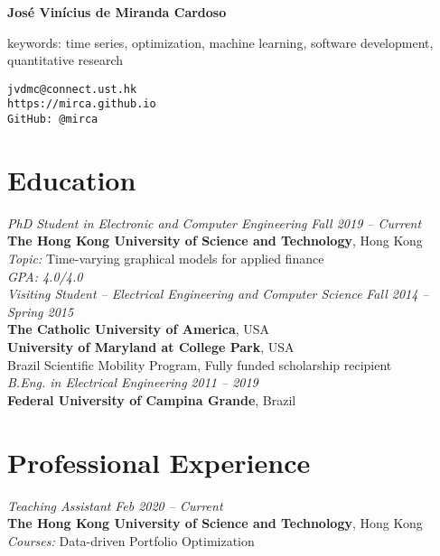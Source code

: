\documentclass[10pt]{article}
\begin{document}
\pagestyle{empty}
\begin{titlepage}
     {\Large{\textbf{Jos\'e Vin\'icius de Miranda Cardoso}}}
     \vspace{.5cm}

    \begin{minipage}[b]{9cm}
      keywords: time series, optimization, machine learning, software development, quantitative research\\
    \end{minipage}
    \hfill
    \begin{minipage}[b]{4cm}
        \hfill \texttt{jvdmc@connect.ust.hk}\\
        \texttt{https://mirca.github.io}\\
        \texttt{GitHub: @mirca}
    \end{minipage}


\section*{Education}

\emph{PhD Student in Electronic and Computer Engineering} \hfill \textit{Fall 2019 -- Current} \\
\textbf{The Hong Kong University of Science and Technology}, Hong Kong\\
\textit{Topic:} Time-varying graphical models for applied finance\\
\textit{GPA: 4.0/4.0}\\

\emph{Visiting Student -- Electrical Engineering and Computer Science} \hfill \textit{Fall 2014 -- Spring 2015} \\
\textbf{The Catholic University of America}, USA\\
\textbf{University of Maryland at College Park}, USA \\
Brazil Scientific Mobility Program, Fully funded scholarship recipient \\

\emph{B.Eng. in Electrical Engineering} \hfill \textit{2011 -- 2019} \\
\textbf{Federal University of Campina Grande}, Brazil

\section*{Professional Experience}
\emph{Teaching Assistant} \hfill \textit{Feb 2020 -- Current}
\\ \textbf{The Hong Kong University of Science and Technology}, Hong Kong
\\ {\small\textit{Courses:} Data-driven Portfolio Optimization}
\vspace{.5cm}


\end{titlepage}
\end{document}
